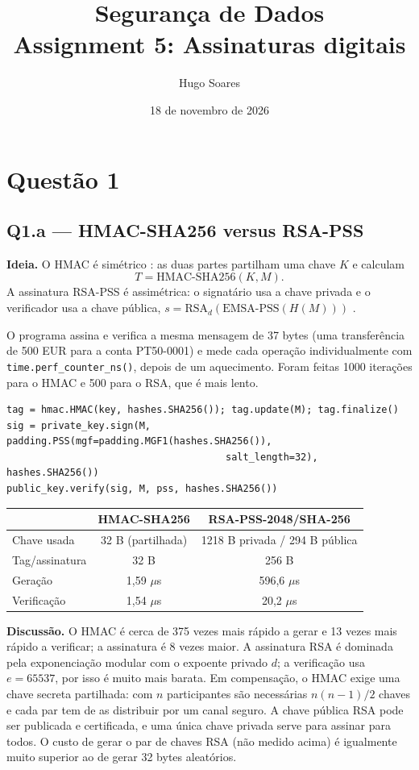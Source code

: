 \documentclass[11pt,a4paper]{article}
\title{Segurança de Dados\\\large Assignment 5: Assinaturas digitais}
\author{Hugo Soares}
\date{18 de novembro de 2026}
\begin{document}
\maketitle

\section*{Questão 1}

\subsection*{Q1.a --- HMAC-SHA256 versus RSA-PSS}

\textbf{Ideia.} O HMAC é simétrico \cite{rfc2104}: as duas partes partilham
uma chave $K$ e calculam
\[
T = \mathrm{HMAC\text{-}SHA256}(K, M).
\]
A assinatura RSA-PSS é
assimétrica: o signatário usa a chave privada e o verificador usa a chave
pública,
$s = \mathrm{RSA}_{d}(\mathrm{EMSA\text{-}PSS}(H(M)))$ \cite{rfc8017}.

O programa assina e verifica a mesma mensagem de 37 bytes (uma transferência de
500 EUR para a conta PT50-0001) e mede cada operação
individualmente com \texttt{time.perf\_counter\_ns()}, depois de um
aquecimento. Foram feitas 1000 iterações para o HMAC e 500 para o RSA, que é
mais lento.

\begin{verbatim}
tag = hmac.HMAC(key, hashes.SHA256()); tag.update(M); tag.finalize()
sig = private_key.sign(M, padding.PSS(mgf=padding.MGF1(hashes.SHA256()),
                                      salt_length=32), hashes.SHA256())
public_key.verify(sig, M, pss, hashes.SHA256())
\end{verbatim}

\begin{center}
\begin{tabular}{lcc}
\toprule
 & HMAC-SHA256 & RSA-PSS-2048/SHA-256 \\
\midrule
Chave usada & 32 B (partilhada) & 1218 B privada / 294 B pública \\
Tag/assinatura & 32 B & 256 B \\
Geração & 1,59 $\mu$s & 596,6 $\mu$s \\
Verificação & 1,54 $\mu$s & 20,2 $\mu$s \\
\bottomrule
\end{tabular}
\end{center}

\textbf{Discussão.} O HMAC é cerca de 375 vezes mais rápido a gerar e 13 vezes
mais rápido a verificar; a assinatura é 8 vezes maior. A assinatura RSA é
dominada pela exponenciação modular com o expoente privado $d$; a verificação
usa $e=65537$, por isso é muito mais barata. Em compensação, o HMAC exige uma
chave secreta partilhada: com $n$ participantes são necessárias
$n(n-1)/2$ chaves e cada par tem de as distribuir por um canal seguro. A chave
pública RSA pode ser publicada e certificada, e uma única chave privada serve
para assinar para todos. O custo de gerar o par de chaves RSA (não medido
acima) é igualmente muito superior ao de gerar 32 bytes aleatórios.
\end{document}
